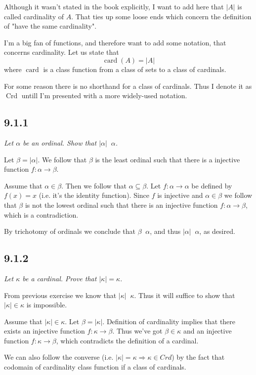 \documentclass[11pt,oneside,titlepage]{book}
\DeclareMathOperator \ra {\Rightarrow}
\DeclareMathOperator \card {card}
\DeclareMathOperator \Crd {Crd}
\DeclareMathOperator \ineq {\underline{\in}}
\begin{document}
Although it wasn't stated in the book explicitly, I want to add here that
$|A|$ is called cardinality of $A$. That ties up some loose ends which concern the
definition of "have the same cardinality".

I'm a big fan of functions, and therefore want to add some notation, that concerns cardinality.
Let us state that 
$$\card(A) = |A|$$
where $\card$ is a class function from a class of sets to a class of cardinals.

For some reason there is no shorthand for a class of cardinals. Thus I denote it as
$\Crd$ untill I'm presented with a more widely-used notation.

\subsection*{9.1.1}

\textit{Let $\alpha$ be an ordinal. Show that $|\alpha| \ineq \alpha$.}

Let $\beta = |\alpha|$. We follow that $\beta$ is the least ordinal such that there
is a injective function $f: \alpha \to \beta$. 

Assume that $\alpha \in \beta$. Then we follow that $\alpha \subseteq \beta$.
Let $f: \alpha \to \alpha$ be defined by $f(x) = x$ (i.e. it's the identity function).
Since $f$ is injective and $\alpha \in \beta$ we follow that $\beta$ is not the lowest
ordinal such that there is an injective function $f: \alpha \to \beta$, which is a contradiction.

By trichotomy of ordinals we conclude that $\beta \ineq \alpha$,
and thus $|\alpha| \ineq \alpha$, as desired.

\subsection*{9.1.2}

\textit{Let $\kappa$ be a cardinal. Prove that $|\kappa| = \kappa$.}

From previous exercise we know that $|\kappa| \ineq \kappa$. Thus it will suffice to show that
$|\kappa| \in \kappa$ is impossible.

Assume that $|\kappa| \in \kappa$. Let $\beta = |\kappa|$. Definition of cardinality
implies that there exists an injective function $f: \kappa \to \beta$. Thus
we've got $\beta \in \kappa$ and an injective function $f: \kappa \to \beta$,
which contradicts the definition of a cardinal.

We can also follow the converse (i.e. $|\kappa| = \kappa \ra \kappa \in Crd$)
by the fact that codomain of cardinality class function
if a class of cardinals.
\end{document}
